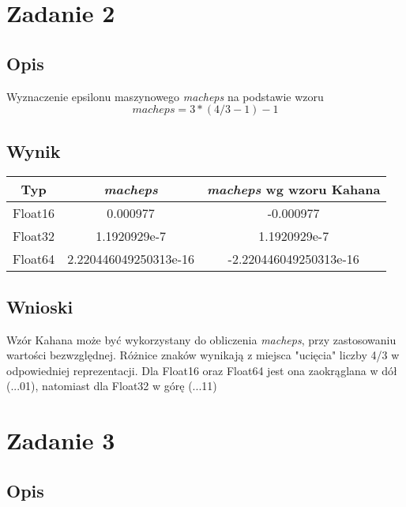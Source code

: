 \documentclass[12pt, letterpaper]{article}
\begin{document}
\section{Zadanie 2}

\subsection{Opis}

Wyznaczenie epsilonu maszynowego \textit{macheps} na podstawie wzoru
\[ macheps = 3*(4/3 - 1) - 1 \]

\subsection{Wynik}

\begin{center}
    \begin{tabular}{|c | c | c|}
        \hline
        Typ     & \textit{macheps}      & \textit{macheps} wg wzoru Kahana \\
        \hline
        Float16 & 0.000977              & -0.000977                        \\
        \hline
        Float32 & 1.1920929e-7          & 1.1920929e-7                     \\
        \hline
        Float64 & 2.220446049250313e-16 & -2.220446049250313e-16           \\
        \hline
    \end{tabular}
\end{center}

\subsection{Wnioski}

Wzór Kahana może być wykorzystany do obliczenia \textit{macheps}, przy
zastosowaniu wartości bezwzględnej.
Różnice znaków wynikają z miejsca "ucięcia" liczby 4/3 w odpowiedniej
reprezentacji.
Dla Float16 oraz Float64 jest ona zaokrąglana w dół (...01), natomiast dla
Float32 w górę (...11)

\section{Zadanie 3}

\subsection{Opis}
\end{document}
